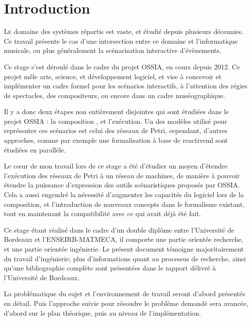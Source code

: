 \chapter*{Introduction}
\lettrine[lines=2]{L}{e} domaine des systèmes répartis est vaste, et étudié depuis plusieurs décennies. Ce travail présente le cas d'une intersection entre ce domaine et l'informatique musicale, ou plus généralement la scénarisation interactive d'évènements. 

Ce stage s'est déroulé dans le cadre du projet  \ac{OSSIA}, en cours depuis 2012. Ce projet mêle arts, science, et développement logiciel, et vise à concevoir et implémenter un cadre formel pour les scénarios interactifs, à l'attention des régies de spectacles, des compositeurs, ou encore dans un cadre muséographique. 

Il y a donc deux étapes non entièrement disjointes qui sont étudiées dans le projet \ac{OSSIA} : la composition , et l'exécution.
Un des modèles utilisé pour représenter ces scénarios est celui des réseaux de Petri, cependant, d'autres approches, comme par exemple une formalisation à base de \gls{reactiveml} sont étudiées en parallèle. 

Le cœur de mon travail lors de ce stage a été d'étudier un moyen d'étendre l'exécution des réseaux de Petri à un réseau de machines, de manière à pouvoir étendre la puissance d'expression des outils scénaristiques proposés par \ac{OSSIA}.
Cela a aussi engendré la nécessité d'augmenter les capacités du logiciel lors de la composition, et l'introduction de nouveaux concepts dans le formalisme existant, tout en maintenant la compatibilité avec ce qui avait déjà été fait.

Ce stage étant réalisé dans le cadre d'un double diplôme entre l'Université de Bordeaux et l'ENSEIRB-MATMECA, il comporte une partie orientée recherche, et une partie orientée ingénierie. Le présent document témoigne majoritairement du travail d'ingénierie; plus d'informations quant au processus de recherche, ainsi qu'une bibliographie complète sont présentées dans le rapport délivré à l'Université de Bordeaux.

La problématique du sujet et l'environnement de travail seront d'abord présentés en détail. Puis l'approche suivie pour résoudre le problème demandé sera avancée, d'abord sur le plan théorique, puis au niveau de l'implémentation.